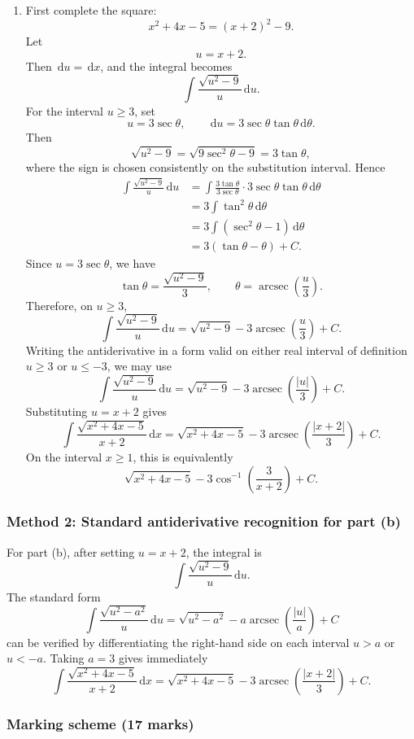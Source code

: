 \documentclass[12pt]{article}
\newcommand{\dd}{\,\mathrm{d}}
\newcommand{\abs}[1]{\left|#1\right|}
\newcommand{\arcsec}{\operatorname{arcsec}}
\begin{document}
\begin{enumerate}[label=(\alph*)]
\item First complete the square:
\[
x^2+4x-5=(x+2)^2-9.
\]
Let
\[
u=x+2.
\]
Then $\dd u=\dd x$, and the integral becomes
\[
\int \frac{\sqrt{u^2-9}}{u}\dd u.
\]
For the interval $u\geq 3$, set
\[
u=3\sec\theta,
\qquad \dd u=3\sec\theta\tan\theta\dd\theta.
\]
Then
\[
\sqrt{u^2-9}=\sqrt{9\sec^2\theta-9}=3\tan\theta,
\]
where the sign is chosen consistently on the substitution interval. Hence
\begin{align*}
\int \frac{\sqrt{u^2-9}}{u}\dd u
&=\int \frac{3\tan\theta}{3\sec\theta}\cdot 3\sec\theta\tan\theta\dd\theta \\
&=3\int \tan^2\theta\dd\theta \\
&=3\int (\sec^2\theta-1)\dd\theta \\
&=3(\tan\theta-\theta)+C.
\end{align*}
Since $u=3\sec\theta$, we have
\[
\tan\theta=\frac{\sqrt{u^2-9}}{3},
\qquad
\theta=\arcsec\left(\frac{u}{3}\right).
\]
Therefore, on $u\geq 3$,
\[
\int \frac{\sqrt{u^2-9}}{u}\dd u
=\sqrt{u^2-9}-3\arcsec\left(\frac{u}{3}\right)+C.
\]
Writing the antiderivative in a form valid on either real interval of definition $u\geq 3$ or $u\leq -3$, we may use
\[
\int \frac{\sqrt{u^2-9}}{u}\dd u
=\sqrt{u^2-9}-3\arcsec\left(\frac{\abs{u}}{3}\right)+C.
\]
Substituting $u=x+2$ gives
\[
\boxed{\displaystyle
\int \frac{\sqrt{x^2+4x-5}}{x+2}\dd x
=\sqrt{x^2+4x-5}-3\arcsec\left(\frac{\abs{x+2}}{3}\right)+C.}
\]
On the interval $x\geq 1$, this is equivalently
\[
\boxed{\displaystyle
\sqrt{x^2+4x-5}-3\cos^{-1}\left(\frac{3}{x+2}\right)+C.}
\]
\end{enumerate}

\newpage
\subsubsection{Method 2: Standard antiderivative recognition for part (b)}

For part (b), after setting $u=x+2$, the integral is
\[
\int \frac{\sqrt{u^2-9}}{u}\dd u.
\]
The standard form
\[
\int \frac{\sqrt{u^2-a^2}}{u}\dd u
=\sqrt{u^2-a^2}-a\arcsec\left(\frac{\abs{u}}{a}\right)+C
\]
can be verified by differentiating the right-hand side on each interval $u>a$ or $u<-a$. Taking $a=3$ gives immediately
\[
\boxed{\displaystyle
\int \frac{\sqrt{x^2+4x-5}}{x+2}\dd x
=\sqrt{x^2+4x-5}-3\arcsec\left(\frac{\abs{x+2}}{3}\right)+C.}
\]

\subsubsection{Marking scheme (17 marks)}
\end{document}
